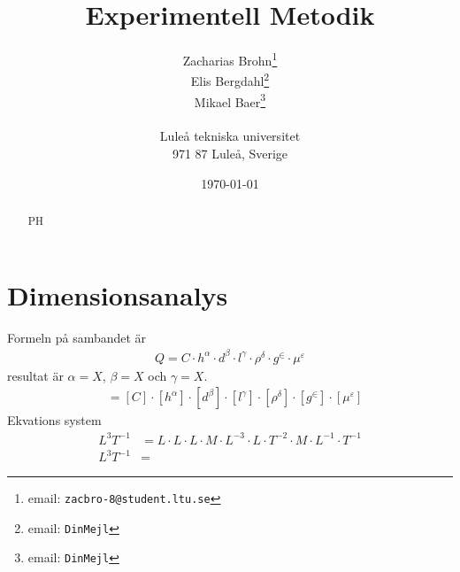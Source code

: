 \documentclass[a4paper,12pt]{article}
\title{Experimentell Metodik}
\author{Zacharias Brohn\thanks{email: \texttt{zacbro-8@student.ltu.se}}\\  
        Elis Bergdahl\thanks{email: \texttt{DinMejl}} \\
        Mikael Baer\thanks{email: \texttt{DinMejl}} \\
        ~ \\
        Luleå tekniska universitet \\ 
        971 87 Luleå, Sverige}
\date{\today}
\begin{document}
%
\begin{abstract}
    PH
\end{abstract}
%
\section{Dimensionsanalys}
Formeln på sambandet är
\begin{align}
    Q = C \cdot h^\alpha \cdot d^\beta \cdot l^\gamma \cdot \rho^\delta \cdot g^\in \cdot \mu^\varepsilon
\end{align}
resultat är $\alpha = X$, $\beta = X$ och $\gamma = X$.
\begin{align}
    [Q] &= [C] \cdot [h^\alpha] \cdot [d^\beta] \cdot [l^\gamma] \cdot [\rho^\delta] \cdot [g^\in] \cdot [\mu^\varepsilon]
\end{align}
Ekvations system
\begin{align}
    L^3T^{-1} &= L \cdot L \cdot L \cdot M \cdot L^{-3} \cdot L \cdot T^{-2} \cdot M \cdot L^{-1} \cdot T^{-1} \\
    L^3T^{-1} &= 
\end{align}
\end{document}
